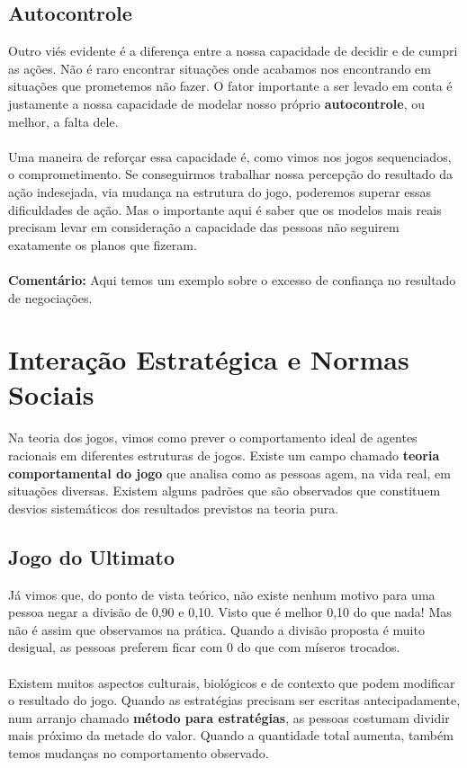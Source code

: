 \documentclass[a4paper,11pt,oneside]{book}
\theoremstyle{definition}
\theoremstyle{break}
\begin{document}
\subsection{Autocontrole}

Outro viés evidente é a  diferença entre a nossa capacidade de decidir e de cumpri as ações. Não é raro encontrar situações onde acabamos nos encontrando em situações que prometemos não fazer. O fator importante a ser levado em conta é justamente a nossa capacidade de modelar nosso próprio \textbf{autocontrole}, ou melhor, a falta dele.
\\~\\
Uma maneira de reforçar essa capacidade é, como vimos nos jogos sequenciados, o comprometimento. Se conseguirmos trabalhar nossa percepção do resultado da ação indesejada, via mudança na estrutura do jogo, poderemos superar essas dificuldades de ação. Mas o importante aqui é saber que os modelos mais reais precisam levar em consideração a capacidade das pessoas não seguirem exatamente os planos que fizeram.
\\~\\
\textbf{Comentário:} Aqui temos um exemplo sobre o excesso de confiança no resultado de negociações.

\section{Interação Estratégica e Normas Sociais}

Na teoria dos jogos, vimos como prever o comportamento ideal de agentes racionais em diferentes estruturas de jogos. Existe um campo chamado \textbf{teoria comportamental do jogo} que analisa como as pessoas agem, na vida real, em situações diversas. Existem alguns padrões que são observados que constituem desvios sistemáticos dos resultados previstos na teoria pura.

\subsection{Jogo do Ultimato}

Já vimos que, do ponto de vista teórico, não existe nenhum motivo para uma pessoa negar a divisão de 0,90 e 0,10. Visto que é melhor 0,10 do que nada! Mas não é assim que observamos  na prática. Quando a divisão proposta é muito desigual, as pessoas preferem ficar com 0 do que com míseros trocados.
\\~\\
Existem muitos aspectos culturais, biológicos e de contexto que podem modificar o resultado do jogo. Quando as estratégias precisam ser escritas antecipadamente, num arranjo chamado \textbf{método para estratégias}, as pessoas costumam dividir mais próximo da metade do valor. Quando a quantidade total aumenta, também temos mudanças no comportamento observado.
\end{document}
